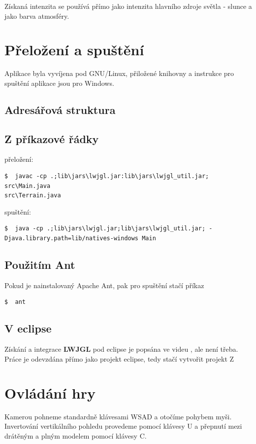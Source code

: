 \documentclass[11pt]{article}
\begin{document}
Získaná intenzita se používá přímo jako intenzita hlavního zdroje světla - slunce a jako barva atmosféry.

\section{Přeložení a spuštění}
Aplikace byla vyvíjena pod GNU/Linux, přiložené knihovny a instrukce pro spuštění aplikace jsou pro Windows.

\subsection{Adresářová struktura}
\subsection{Z příkazové řádky}
přeložení:
\begin{verbatim}
$  javac -cp .;lib\jars\lwjgl.jar:lib\jars\lwjgl_util.jar; src\Main.java
src\Terrain.java
\end{verbatim}
spuštění:
\begin{verbatim}
$  java -cp .;lib\jars\lwjgl.jar;lib\jars\lwjgl_util.jar; -Djava.library.path=lib/natives-windows Main
\end{verbatim}
\subsection{Použitím Ant}
Pokud je nainstalovaný Apache Ant, pak pro spuštění stačí příkaz
\begin{verbatim}
$  ant
\end{verbatim}
\subsection{V eclipse}
Získání a integrace \textbf {LWJGL} pod eclipse je popsána ve videu
\cite{installtut}, ale není třeba. Práce je odevzdána přímo jako projekt
eclipse, tedy stačí vytvořit projekt Z


\section{Ovládání hry}
Kamerou pohneme standardně klávesami WSAD a otočíme pohybem myši. Invertování
vertikálního pohledu provedeme pomocí klávesy U a přepnutí mezi drátěným a
plným modelem pomocí klávesy C.
\end{document}

